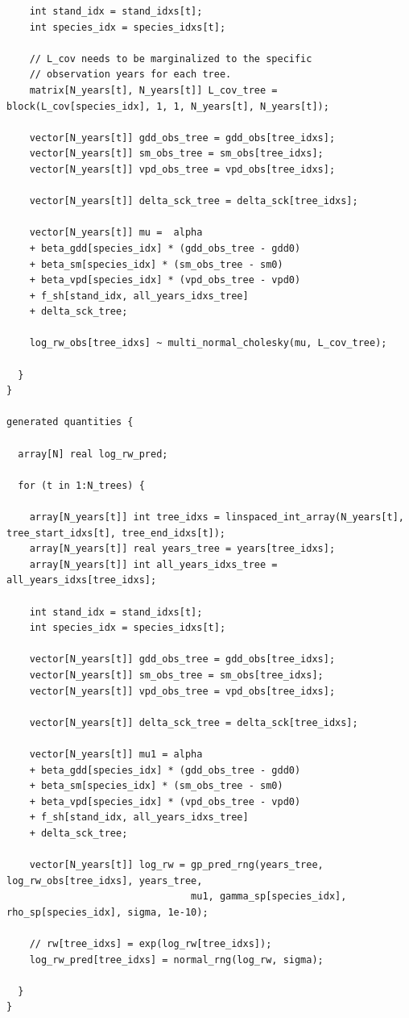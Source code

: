 \documentclass[
  letterpaper,
  DIV=11,
  numbers=noendperiod]{scrartcl}
\begin{document}
\begin{verbatim}
    int stand_idx = stand_idxs[t];
    int species_idx = species_idxs[t];

    // L_cov needs to be marginalized to the specific
    // observation years for each tree.
    matrix[N_years[t], N_years[t]] L_cov_tree = block(L_cov[species_idx], 1, 1, N_years[t], N_years[t]);

    vector[N_years[t]] gdd_obs_tree = gdd_obs[tree_idxs];
    vector[N_years[t]] sm_obs_tree = sm_obs[tree_idxs];
    vector[N_years[t]] vpd_obs_tree = vpd_obs[tree_idxs];

    vector[N_years[t]] delta_sck_tree = delta_sck[tree_idxs];

    vector[N_years[t]] mu =  alpha
    + beta_gdd[species_idx] * (gdd_obs_tree - gdd0)
    + beta_sm[species_idx] * (sm_obs_tree - sm0)
    + beta_vpd[species_idx] * (vpd_obs_tree - vpd0)
    + f_sh[stand_idx, all_years_idxs_tree]
    + delta_sck_tree;

    log_rw_obs[tree_idxs] ~ multi_normal_cholesky(mu, L_cov_tree);

  }
}

generated quantities {

  array[N] real log_rw_pred;

  for (t in 1:N_trees) {

    array[N_years[t]] int tree_idxs = linspaced_int_array(N_years[t], tree_start_idxs[t], tree_end_idxs[t]);
    array[N_years[t]] real years_tree = years[tree_idxs];
    array[N_years[t]] int all_years_idxs_tree = all_years_idxs[tree_idxs];

    int stand_idx = stand_idxs[t];
    int species_idx = species_idxs[t];

    vector[N_years[t]] gdd_obs_tree = gdd_obs[tree_idxs];
    vector[N_years[t]] sm_obs_tree = sm_obs[tree_idxs];
    vector[N_years[t]] vpd_obs_tree = vpd_obs[tree_idxs];

    vector[N_years[t]] delta_sck_tree = delta_sck[tree_idxs];

    vector[N_years[t]] mu1 = alpha
    + beta_gdd[species_idx] * (gdd_obs_tree - gdd0)
    + beta_sm[species_idx] * (sm_obs_tree - sm0)
    + beta_vpd[species_idx] * (vpd_obs_tree - vpd0)
    + f_sh[stand_idx, all_years_idxs_tree]
    + delta_sck_tree;

    vector[N_years[t]] log_rw = gp_pred_rng(years_tree, log_rw_obs[tree_idxs], years_tree,
                                mu1, gamma_sp[species_idx], rho_sp[species_idx], sigma, 1e-10);

    // rw[tree_idxs] = exp(log_rw[tree_idxs]);
    log_rw_pred[tree_idxs] = normal_rng(log_rw, sigma);

  }
}
\end{verbatim}

\linespread{2}
\end{document}
